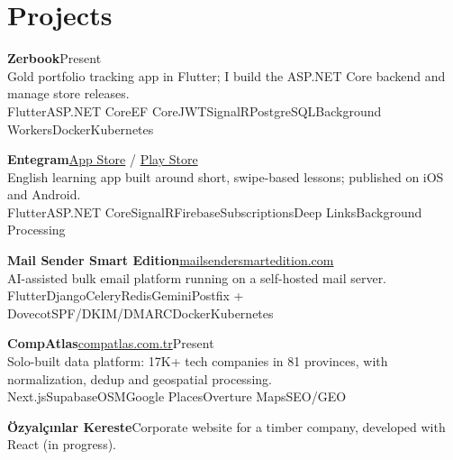\documentclass[10pt,a4paper]{extarticle}
\newcommand{\sep}{\;\textperiodcentered\;}
\newcommand{\tech}[1]{{\footnotesize\color{muted}#1}}
\begin{document}
\section{Projects}
\begin{bullets}[itemsep=1pt]

\item \textbf{Zerbook}\hfill{\color{muted}Present}\\
Gold portfolio tracking app in Flutter; I build the ASP.NET Core backend and manage store releases.\\[0.5pt]
\tech{Flutter\sep ASP.NET Core\sep EF Core\sep JWT\sep SignalR\sep PostgreSQL\sep Background Workers\sep Docker\sep Kubernetes}

\item \textbf{Entegram}\sep\href{https://apps.apple.com/tr/app/entegram-kayd\%C4\%B1r-\%C3\%B6\%C4\%9Fren/id6766254758?l=tr}{App Store} / \href{https://play.google.com/store/apps/details?id=com.enesorhan.gibigram.gibigram_mobile}{Play Store}\\
English learning app built around short, swipe-based lessons; published on iOS and Android.\\[0.5pt]
\tech{Flutter\sep ASP.NET Core\sep SignalR\sep Firebase\sep Subscriptions\sep Deep Links\sep Background Processing}

\item \textbf{Mail Sender Smart Edition}\sep\href{https://mailsendersmartedition.com}{mailsendersmartedition.com}\\
AI-assisted bulk email platform running on a self-hosted mail server.\\[0.5pt]
\tech{Flutter\sep Django\sep Celery\sep Redis\sep Gemini\sep Postfix + Dovecot\sep SPF/DKIM/DMARC\sep Docker\sep Kubernetes}

\item \textbf{CompAtlas}\sep\href{https://compatlas.com.tr/}{compatlas.com.tr}\hfill{\color{muted}Present}\\
Solo-built data platform: 17K+ tech companies in 81 provinces, with normalization, dedup and geospatial processing.\\[0.5pt]
\tech{Next.js\sep Supabase\sep OSM\sep Google Places\sep Overture Maps\sep SEO/GEO}

\item \textbf{Özyalçınlar Kereste}\sep Corporate website for a timber company, developed with React {\color{muted}(in progress)}.

\end{bullets}
\end{document}
